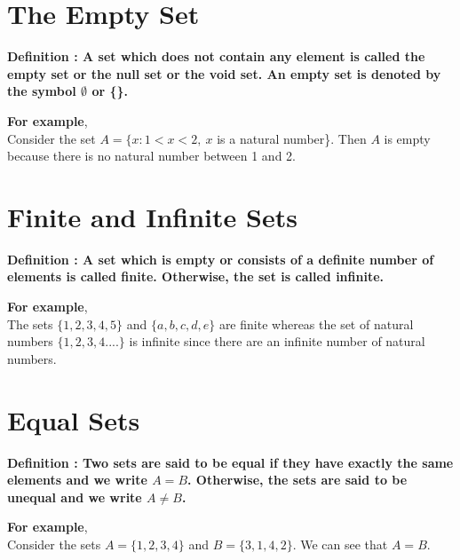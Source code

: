 \documentclass[12pt, letterpaper]{article}
\begin{document}
\section{The Empty Set}
\begin{displayquote}
\textbf{Definition : A set which does not contain any element is called the empty set or the null set or the void set. An empty set is denoted by the symbol $\emptyset$ or \{\}.}
\end{displayquote}
\textbf{For example},\\ 
Consider the set $A = \{x: 1 < x < 2, \ x$ is a natural number\}. Then $A$ is empty because there is no natural number between 1 and 2.


\section{Finite and Infinite Sets}
 \begin{displayquote}
 \textbf{Definition : A set which is empty or consists of a definite number of elements is called finite. Otherwise, the set is called infinite.}
 \end{displayquote}
\textbf{For example},\\ 
The sets $\{1,2,3,4,5\}$ and $\{a,b,c,d,e\}$ are finite whereas the set of natural numbers $\{1,2,3,4....\}$ is infinite since there are an infinite number of natural numbers.


\section{Equal Sets}
\begin{displayquote}
\textbf{Definition : Two sets are said to be equal if they have exactly the same elements and we write $A = B$. Otherwise, the sets are said to be unequal and we write $A \neq B$.}
\end{displayquote}
\textbf{For example},\\ 
Consider the sets $A = \{1,2,3,4\}$ and $B = \{3,1,4,2\}$. We can see that $A = B$.
\end{document}
